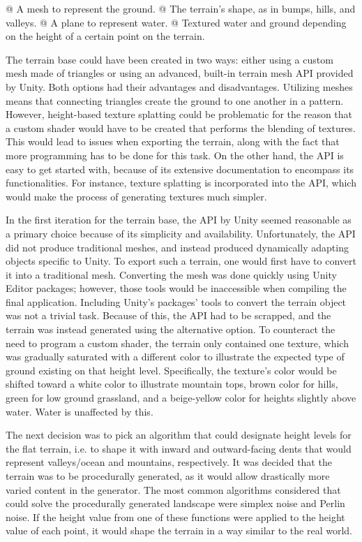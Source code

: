 \begin{easylist}
 @ A mesh to represent the ground.
 @ The terrain's shape, as in bumps, hills, and valleys.
 @ A plane to represent water.
 @ Textured water and ground depending on the height of a certain point on the terrain.
\end{easylist}

The terrain base could have been created in two ways: either using a custom mesh made of triangles or using an advanced, built-in terrain mesh API provided by Unity.
Both options had their advantages and disadvantages.
Utilizing meshes means that connecting triangles create the ground to one another in a pattern.
However, height-based texture splatting could be problematic for the reason that a custom shader would have to be created that performs the blending of textures.
This would lead to issues when exporting the terrain, along with the fact that more programming has to be done for this task.
On the other hand, the API is easy to get started with, because of its extensive documentation to encompass its functionalities.
For instance, texture splatting is incorporated into the API, which would make the process of generating textures much simpler.

In the first iteration for the terrain base, the API by Unity seemed reasonable as a primary choice because of its simplicity and availability.
Unfortunately, the API did not produce traditional meshes, and instead produced dynamically adapting objects specific to Unity.
To export such a terrain, one would first have to convert it into a traditional mesh.
Converting the mesh was done quickly using Unity Editor packages; however, those tools would be inaccessible when compiling the final application.
Including Unity's packages' tools to convert the terrain object was not a trivial task.
Because of this, the API had to be scrapped, and the terrain was instead generated using the alternative option.
To counteract the need to program a custom shader, the terrain only contained one texture, which was gradually saturated with a different color to illustrate the expected type of ground existing on that height level.
Specifically, the texture's color would be shifted toward a white color to illustrate mountain tops, brown color for hills, green for low ground grassland, and a beige-yellow color for heights slightly above water.
Water is unaffected by this.

The next decision was to pick an algorithm that could designate height levels for the flat terrain, i.e. to shape it with inward and outward-facing dents that would represent valleys/ocean and mountains, respectively.
It was decided that the terrain was to be procedurally generated, as it would allow drastically more varied content in the generator.
The most common algorithms considered that could solve the procedurally generated landscape were simplex noise and Perlin noise.
If the height value from one of these functions were applied to the height value of each point, it would shape the terrain in a way similar to the real world.

